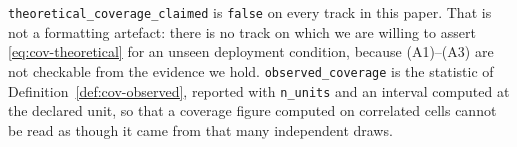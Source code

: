 \begin{remark}\label{rem:report-reading}
\texttt{theoretical\_coverage\_claimed} is \texttt{false} on every track in this paper.
That is not a formatting artefact: there is no track on which we are willing to assert
\eqref{eq:cov-theoretical} for an unseen deployment condition, because (A1)--(A3) are not
checkable from the evidence we hold. \texttt{observed\_coverage} is the statistic of
Definition~\ref{def:cov-observed}, reported with \texttt{n\_units} and an interval
computed at the declared unit, so that a coverage figure computed on correlated cells
cannot be read as though it came from that many independent draws.
\end{remark}
